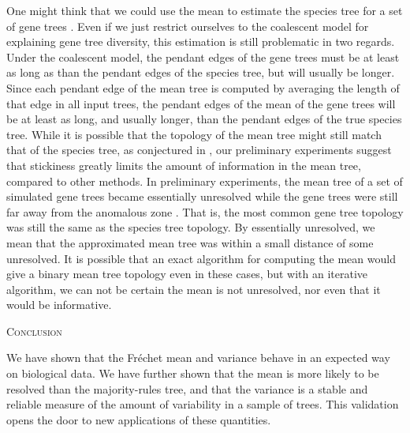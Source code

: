 \documentclass[12pt,letterpaper]{article}
\theoremstyle{plain}
\theoremstyle{definition}
\renewcommand{\section}[1]{%
\bigskip
\begin{center}
\begin{Large}
\normalfont\scshape #1
\medskip
\end{Large}
\end{center}}
\begin{document}
{%
One might think that we could use the mean to estimate the species tree for a set of gene trees \cite[Example 5.5]{MillerOwenProvan2015}.  Even if we just restrict ourselves to the coalescent model for explaining gene tree diversity, this estimation is still problematic in two regards.  Under the coalescent model, the pendant edges of the gene trees must be at least as long as than the pendant edges of the species tree, but will usually be longer.  Since each pendant edge of the mean tree is computed by averaging the length of that edge in all input trees, the pendant edges of the mean of the gene trees will be at least as long, and usually longer, than the pendant edges of the true species tree.  While it is possible that the topology of the mean tree might still match that of the species tree, as conjectured in \cite[Example 5.5]{MillerOwenProvan2015}, our preliminary experiments suggest that stickiness greatly limits the amount of information in the mean tree, compared to other methods.  In preliminary experiments, the mean tree of a set of simulated gene trees became essentially unresolved while the gene trees were still far away from the anomalous zone \citep{DegnanRosenbergAnomalous}.  That is, the most common gene tree topology was still the same as the species tree topology.  By essentially unresolved, we mean that the approximated mean tree was within a small distance of some unresolved.  It is possible that an exact algorithm for computing the mean would give a binary mean tree topology even in these cases, but with an iterative algorithm, we can not be certain the mean is not unresolved, nor even that it would be informative.

\bigskip
\section{Conclusion}

We have shown that the Fr\'echet mean and variance behave in an expected way on biological data.  We have further shown that the mean is more likely to be resolved than the majority-rules tree, and that the variance is a stable and reliable measure of the amount of variability in a sample of trees.  This validation opens the door to new applications of these quantities.

}
\end{document}
